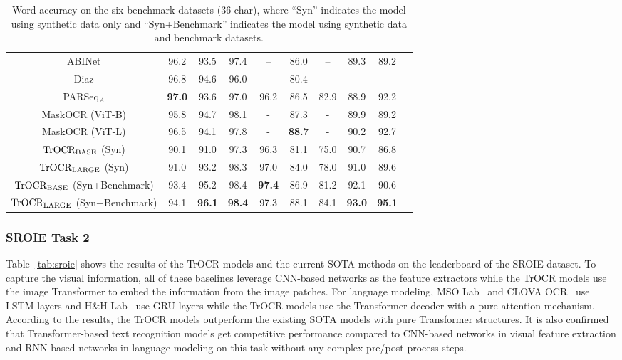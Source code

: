 \documentclass[letterpaper]{article} \usepackage{aaai23}  \usepackage{times}  \usepackage{helvet}  \usepackage{courier}  \usepackage[hyphens]{url}  \usepackage{graphicx} \urlstyle{rm} \def\UrlFont{\rm}  \usepackage{natbib}  \usepackage{caption} \frenchspacing  \setlength{\pdfpagewidth}{8.5in} \setlength{\pdfpageheight}{11in} \usepackage{algorithm}
\begin{document}
\begin{table*}[t]
{\begin{tabular*}{0.76\linewidth}{ c c c c c c c c c c }
        ABINet \cite{Fang_2021_CVPR} & 96.2 & 93.5 & 97.4 & -- & 86.0 & -- & 89.3 & 89.2 \\
        Diaz \cite{diaz2021rethinking} & 96.8 & 94.6 & 96.0 & -- & 80.4 & -- & -- & -- \\
        PARSeq$_{A}$ \cite{bautista2022scene} & \textbf{97.0} & 93.6 & 97.0 & 96.2 & 86.5 & 82.9 & 88.9 & 92.2 \\
        MaskOCR (ViT-B) \cite{lyu2022maskocr} & 95.8 & 94.7 & 98.1 & - & 87.3 & - & 89.9 & 89.2 \\
        MaskOCR (ViT-L) \cite{lyu2022maskocr} & 96.5 & 94.1 & 97.8 & - & \textbf{88.7} & - & 90.2 & 92.7 \\
    \midrule
    $\textrm{TrOCR}_{\rm BASE}$ (Syn) & 90.1 & 91.0 & 97.3 & 96.3 & 81.1 & 75.0 & 90.7 & 86.8  \\
        $\textrm{TrOCR}_{\rm LARGE}$ (Syn) & 91.0 & 93.2 & 98.3 & 97.0 & 84.0 & 78.0 & 91.0 & 89.6  \\
        \midrule
        $\textrm{TrOCR}_{\rm BASE}$ (Syn+Benchmark) & 93.4 & 95.2 & 98.4 & \textbf{97.4} & 86.9 & 81.2 & 92.1 & 90.6  \\
       $\textrm{TrOCR}_{\rm LARGE}$ (Syn+Benchmark)& 94.1 & \textbf{96.1} & \textbf{98.4} & 97.3 & 88.1 & 84.1 & \textbf{93.0} & \textbf{95.1} \\
    \bottomrule
  \end{tabular*}
  }
  \caption{Word accuracy on the six benchmark datasets (36-char), where ``Syn'' indicates the model using synthetic data only and ``Syn+Benchmark'' indicates the model using synthetic data and benchmark datasets. }
  \label{tab:scene}
\end{table*}


\subsubsection{SROIE Task 2}

Table~\ref{tab:sroie} shows the results of the TrOCR models and the current SOTA methods on the leaderboard of the SROIE dataset.
To capture the visual information, all of these baselines leverage CNN-based networks as the feature extractors while the TrOCR models use the image Transformer to embed the information from the image patches. For language modeling, MSO Lab~\cite{sang2019improving} and CLOVA OCR~\cite{sang2019improving} use LSTM layers and H\&H Lab~\cite{shi2016end} use GRU layers while the TrOCR models use the Transformer decoder with a pure attention mechanism. According to the results, the TrOCR models outperform the existing SOTA models with pure Transformer structures. It is also confirmed that Transformer-based text recognition models get competitive performance compared to CNN-based networks in visual feature extraction and RNN-based networks in language modeling on this task without any complex pre/post-process steps.
\end{document}
